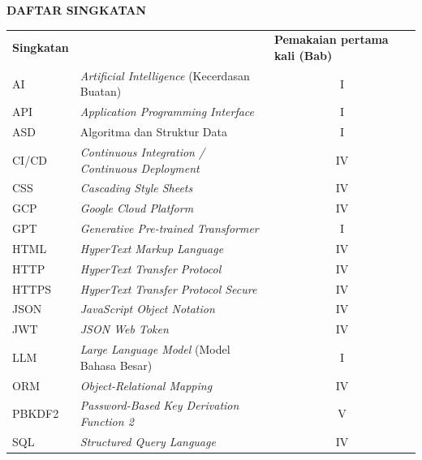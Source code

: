 \cleardoublepage
\vspace{2cm}
\begin{center}
{\fontsize{14}{16.8}\selectfont\textbf{DAFTAR SINGKATAN}}\\[1em]
\end{center}
\label{chap:singkatan}
\setcounter{chapter}{0}
\setcounter{section}{0}
\vspace{2em}




\begin{longtable}{@{} l >{\raggedright\arraybackslash}p{7.5cm} c @{}}
\multicolumn{1}{l}{\textbf{Singkatan}} & \multicolumn{1}{l}{\textbf{Deskripsi}} & \multicolumn{1}{l}{\parbox[c]{3.5cm}{\raggedright \textbf{Pemakaian pertama kali (Bab)}}} \\


AI      & \textit{Artificial Intelligence} (Kecerdasan Buatan)               & I   \\
API     & \textit{Application Programming Interface}                          & I   \\
ASD     & Algoritma dan Struktur Data                                         & I   \\
CI/CD   & \textit{Continuous Integration / Continuous Deployment}             & IV  \\
CSS     & \textit{Cascading Style Sheets}                                     & IV  \\
GCP     & \textit{Google Cloud Platform}                                      & IV  \\
GPT     & \textit{Generative Pre-trained Transformer}                         & I   \\
HTML    & \textit{HyperText Markup Language}                                  & IV  \\
HTTP    & \textit{HyperText Transfer Protocol}                                & IV  \\
HTTPS   & \textit{HyperText Transfer Protocol Secure}                         & IV  \\
JSON    & \textit{JavaScript Object Notation}                                 & IV  \\
JWT     & \textit{JSON Web Token}                                             & IV  \\
LLM     & \textit{Large Language Model} (Model Bahasa Besar)                  & I   \\
ORM     & \textit{Object-Relational Mapping}                                  & IV  \\
PBKDF2  & \textit{Password-Based Key Derivation Function 2}                   & V   \\
SQL     & \textit{Structured Query Language}                                  & IV  \\


\end{longtable}
